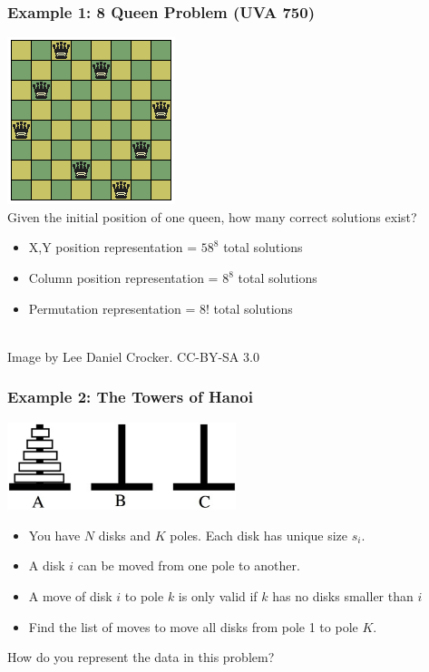 \documentclass{beamer}
\begin{document}

\begin{frame}
  \frametitle{Example 1: 8 Queen Problem (UVA 750)}
  \includegraphics[width=.25\textwidth]{../img/8queen}\\
  Given the initial position of one queen, how many correct solutions exist?
  
  \begin{itemize}
  \item X,Y position representation = $58^8$ total solutions
  \item Column position representation = $8^8$ total solutions
  \item Permutation representation = $8!$ total solutions
  \end{itemize}


  \hrulefill\\
  {\tiny\hfill Image by Lee Daniel Crocker. CC-BY-SA 3.0}
\end{frame}

\begin{frame}
  \frametitle{Example 2: The Towers of Hanoi}
  
  \begin{center}
    \includegraphics[width=0.5\textwidth]{img/hanoi}
  \end{center}
  \medskip

  {\small
    \begin{itemize}
    \item You have $N$ disks and $K$ poles. Each disk has unique size $s_i$.
    \item A disk $i$ can be moved from one pole to another.
    \item A move of disk $i$ to pole $k$ is only valid if $k$ has no disks smaller than $i$
    \item Find the list of moves to move all disks from pole 1 to pole $K$.
    \end{itemize}
  }
  
  \vfill

  How do you represent the data in this problem?
\end{frame}
\end{document}
